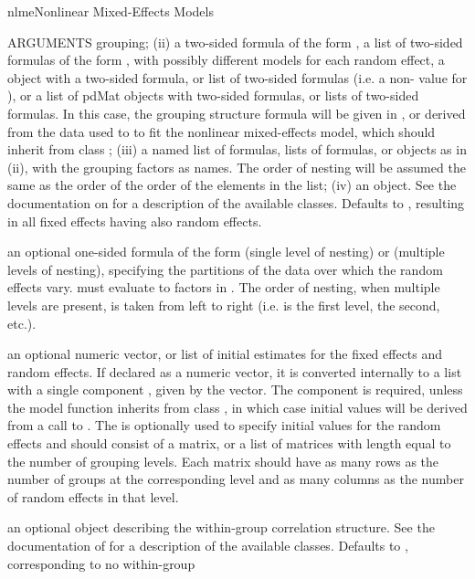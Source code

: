 \documentclass[pdftex]{article} \usepackage{url,graphicx}
\renewcommand{\Twiddle}{\mbox{\(\sim\)}}
\begin{document}
\begin{Helpfile}{nlme}{Nonlinear Mixed-Effects Models}
\begin{Argument}{ARGUMENTS}
grouping; (ii) a two-sided formula of the form
\Co{r1+...+rn{\Twiddle}x1+..+xm}, a list of two-sided formulas of the form
\Co{r1{\Twiddle}x1+...+xm}, with possibly different models for each random
effect, a  object with a two-sided formula, or list of
two-sided formulas (i.e. a non- value for
), or a list of pdMat objects with two-sided
formulas, or lists of two-sided formulas. In this case, the grouping
structure formula will be given in , or derived from the
data used to to fit the nonlinear mixed-effects model, which should
inherit from class  ; (iii) a named list
of formulas, lists of formulas, or  objects as in (ii),
with the grouping factors as names. The order of nesting will be
assumed the same as the order of the order of the elements in the
list; (iv) an  object. See the documentation on
 for a description of the available 
classes. Defaults to , 
resulting in all fixed effects having also random effects.
\item[\Co{groups:}]
an optional one-sided formula of the form \Co{{\Twiddle}g1}
(single level of nesting) or \Co{{\Twiddle}g1/.../gQ} (multiple levels of
nesting), specifying the partitions of the data over which the random
effects vary.  must evaluate to factors in
. The order of nesting, when multiple levels are present,
is taken from left to right (i.e.  is the first level,
 the second, etc.).
\item[\Co{start:}]
an optional numeric vector, or list of initial estimates
for the fixed effects and random effects. If declared as a numeric
vector, it is converted internally to a list with a single component
, given by the vector. The  component
is required, unless the model function inherits from class
, in which case initial values will be derived from a
call to . The  is optionally used to specify
initial values for the random effects and should consist of a matrix,
or a list of matrices with length equal to the number of grouping
levels. Each matrix should have as many rows as the number of groups
at the corresponding level and as many columns as the number of
random effects in that level.
\item[\Co{correlation:}]
an optional  object describing the
within-group correlation structure. See the documentation of
 for a description of the available 
classes. Defaults to , corresponding to no within-group

\end{Argument}
\end{Helpfile}
\end{document}
